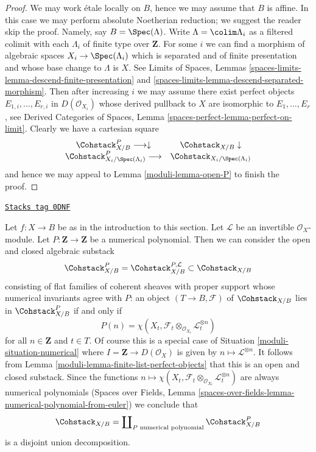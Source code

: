 \begin{proof}

We may work \'etale locally on $B$, hence we may assume that $B$ is affine.
In this case we may perform absolute Noetherian reduction; we suggest
the reader skip the proof. Namely, say $B = \Spec(\Lambda)$.
Write $\Lambda = \colim \Lambda_i$ as a filtered colimit with each $\Lambda_i$
of finite type over $\mathbf{Z}$. For some $i$ we can find
a morphism of algebraic spaces $X_i \to \Spec(\Lambda_i)$
which is separated and of finite presentation and whose base change
to $\Lambda$ is $X$. See Limits of Spaces, Lemmas
\ref{spaces-limits-lemma-descend-finite-presentation} and
\ref{spaces-limits-lemma-descend-separated-morphism}.
Then after increasing $i$ we may assume there exist
perfect objects $E_{1, i}, \ldots, E_{r, i}$
in $D(\mathcal{O}_{X_i})$ whose derived pullback to $X$
are isomorphic to $E_1, \ldots, E_r$, see
Derived Categories of Spaces, Lemma
\ref{spaces-perfect-lemma-perfect-on-limit}.
Clearly we have a cartesian square
$$
\begin{array}{cc}\Cohstack^P_{X/B} \longrightarrow\downarrow & \Cohstack_{X/B} \downarrow \\ \Cohstack^P_{X_i/\Spec(\Lambda_i)} \longrightarrow & \Cohstack_{X_i/\Spec(\Lambda_i)}\end{array}
$$
and hence we may appeal to Lemma \ref{moduli-lemma-open-P}
to finish the proof.
\end{proof}

\begin{example}

\label{moduli-example-hilbert-polynomial}
\href{https://stacks.math.columbia.edu/tag/0DNF}{\texttt{Stacks tag 0DNF}}

Let $f : X \to B$ be as in the introduction to this section.
Let $\mathcal{L}$ be an invertible $\mathcal{O}_X$-module.
Let $P : \mathbf{Z} \to \mathbf{Z}$ be a numerical polynomial.
Then we can consider the open and closed algebraic substack
$$
\Cohstack^P_{X/B} =
\Cohstack^{P, \mathcal{L}}_{X/B}
\subset \Cohstack_{X/B}
$$
consisting of flat families of coherent sheaves with proper support
whose numerical invariants agree with $P$: an object
$(T \to B, \mathcal{F})$ of $\Cohstack_{X/B}$ lies in
$\Cohstack^P_{X/B}$ if and only if
$$
P(n) =
\chi(X_t, \mathcal{F}_t \otimes_{\mathcal{O}_{X_t}} \mathcal{L}_t^{\otimes n})
$$
for all $n \in \mathbf{Z}$ and $t \in T$. Of course this is a
special case of Situation \ref{moduli-situation-numerical}
where $I = \mathbf{Z} \to D(\mathcal{O}_X)$ is given by
$n \mapsto \mathcal{L}^{\otimes n}$. It follows from
Lemma \ref{moduli-lemma-finite-list-perfect-objects}
that this is an open and closed substack. Since the functions
$n \mapsto
\chi(X_t, \mathcal{F}_t \otimes_{\mathcal{O}_{X_t}} \mathcal{L}_t^{\otimes n})$
are always numerical polynomials (Spaces over Fields, Lemma
\ref{spaces-over-fields-lemma-numerical-polynomial-from-euler})
we conclude that
$$
\Cohstack_{X/B} = \coprod\nolimits_{P\text{ numerical polynomial}}
\Cohstack^P_{X/B}
$$
is a disjoint union decomposition.
\end{example}

